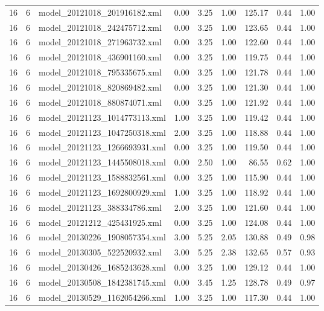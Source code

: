 \begin{table}[ht]
\begin{tabular}{rrlrrrrrr}
   16 &   6 & model\_20121018\_201916182.xml & 0.00 & 3.25 & 1.00 & 125.17 & 0.44 & 1.00 \\ 
   16 &   6 & model\_20121018\_242475712.xml & 0.00 & 3.25 & 1.00 & 123.65 & 0.44 & 1.00 \\ 
   16 &   6 & model\_20121018\_271963732.xml & 0.00 & 3.25 & 1.00 & 122.60 & 0.44 & 1.00 \\ 
   16 &   6 & model\_20121018\_436901160.xml & 0.00 & 3.25 & 1.00 & 119.75 & 0.44 & 1.00 \\ 
   16 &   6 & model\_20121018\_795335675.xml & 0.00 & 3.25 & 1.00 & 121.78 & 0.44 & 1.00 \\ 
   16 &   6 & model\_20121018\_820869482.xml & 0.00 & 3.25 & 1.00 & 121.30 & 0.44 & 1.00 \\ 
   16 &   6 & model\_20121018\_880874071.xml & 0.00 & 3.25 & 1.00 & 121.92 & 0.44 & 1.00 \\ 
   16 &   6 & model\_20121123\_1014773113.xml & 1.00 & 3.25 & 1.00 & 119.42 & 0.44 & 1.00 \\ 
   16 &   6 & model\_20121123\_1047250318.xml & 2.00 & 3.25 & 1.00 & 118.88 & 0.44 & 1.00 \\ 
   16 &   6 & model\_20121123\_1266693931.xml & 0.00 & 3.25 & 1.00 & 119.50 & 0.44 & 1.00 \\ 
   16 &   6 & model\_20121123\_1445508018.xml & 0.00 & 2.50 & 1.00 & 86.55 & 0.62 & 1.00 \\ 
   16 &   6 & model\_20121123\_1588832561.xml & 0.00 & 3.25 & 1.00 & 115.90 & 0.44 & 1.00 \\ 
   16 &   6 & model\_20121123\_1692800929.xml & 1.00 & 3.25 & 1.00 & 118.92 & 0.44 & 1.00 \\ 
   16 &   6 & model\_20121123\_388334786.xml & 2.00 & 3.25 & 1.00 & 121.60 & 0.44 & 1.00 \\ 
   16 &   6 & model\_20121212\_425431925.xml & 0.00 & 3.25 & 1.00 & 124.08 & 0.44 & 1.00 \\ 
   16 &   6 & model\_20130226\_1908057354.xml & 3.00 & 5.25 & 2.05 & 130.88 & 0.49 & 0.98 \\ 
   16 &   6 & model\_20130305\_522520932.xml & 3.00 & 5.25 & 2.38 & 132.65 & 0.57 & 0.93 \\ 
   16 &   6 & model\_20130426\_1685243628.xml & 0.00 & 3.25 & 1.00 & 129.12 & 0.44 & 1.00 \\ 
   16 &   6 & model\_20130508\_1842381745.xml & 0.00 & 3.45 & 1.25 & 128.78 & 0.49 & 0.97 \\ 
   16 &   6 & model\_20130529\_1162054266.xml & 1.00 & 3.25 & 1.00 & 117.30 & 0.44 & 1.00 \\ 

\end{tabular}
\end{table}
